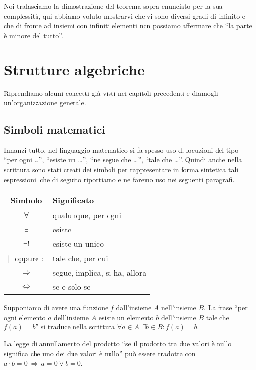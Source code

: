 Noi tralasciamo la dimostrazione del teorema sopra enunciato per la sua complessità,
qui abbiamo voluto mostrarvi che vi sono diversi gradi di infinito e che di fronte ad insiemi con infiniti elementi non possiamo affermare che
``la parte è minore del tutto''.

\ovalbox{\risolvii \ref{ese:E.10}, \ref{ese:E.11}, \ref{ese:E.12}, \ref{ese:E.13}, \ref{ese:E.14}, \ref{ese:E.15}, \ref{ese:E.16}}


\section{Strutture algebriche}

Riprendiamo alcuni concetti già visti nei capitoli precedenti e diamogli un'organizzazione generale.

\subsection{Simboli matematici}

Innanzi tutto, nel linguaggio matematico si fa spesso uso di locuzioni del tipo ``per ogni \ldots'', ``esiste un \ldots'', ``ne segue che \ldots'', ``tale che \ldots''. Quindi anche nella scrittura sono stati creati dei simboli per rappresentare in forma sintetica tali espressioni, che di seguito riportiamo e ne faremo uso nei seguenti paragrafi.

\begin{table}[!hb]
\begin{center}
\begin{tabular}{cl}
\toprule
Simbolo & Significato\\
\midrule
$\forall$ & qualunque, per ogni \\
$\exists$ & esiste \\
$\exists!$ & esiste un unico \\
$|\;$ oppure $:$ & tale che, per cui \\
$\Rightarrow$ & segue, implica, si ha, allora \\
$\Leftrightarrow$ & se e solo se \\
\bottomrule
\end{tabular}
\end{center}
\end{table}

\begin{exrig}
 \begin{esempio}
 Supponiamo di avere una funzione $f$ dall'insieme $A$ nell'insieme $B$. La frase ``per ogni elemento $a$ dell'insieme $A$ esiste un elemento $b$ dell'insieme $B$ tale che $f(a)=b$'' si traduce nella scrittura
$\forall a\in A\:\:\exists b \in B : f(a)=b$. 
 \end{esempio}
 
 \begin{esempio}
 La legge di annullamento del prodotto ``se il prodotto tra due valori è nullo significa che uno dei due valori è nullo'' può essere tradotta con
 $a\cdot b = 0 \:\Rightarrow\: a=0 \vee b=0$.

 \end{esempio}
\end{exrig}

